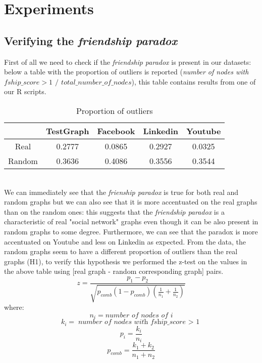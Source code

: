 \documentclass{article}
\begin{document}

\section{Experiments}
\subsection{Verifying the \textit{friendship paradox}}
First of all we need to check if the \textit{friendship paradox} is present in our datasets: below a table with the proportion of outliers is reported (\textit{number of nodes with $fship\_score > 1$ $/$ $total\_number\_of\_nodes$}), this table contains results from one of our R scripts. 
\begin{table}[ht]
\centering
\begin{tabular}{|c|c|c|c|c|}
\hline
& TestGraph & Facebook & Linkedin & Youtube \\ \hline
Real & 0.2777 & 0.0865 & 0.2927 & 0.0325\\ \hline
Random & 0.3636 & 0.4086 & 0.3556 & 0.3544 \\ \hline
\end{tabular}
\caption{Proportion of outliers}
\end{table} 
\\

We can immediately see that the \textit{frienship paradox} is true for both real and random graphs but we can also see that it is more accentuated on the real graphs than on the random ones: this suggests that the \textit{friendship paradox} is a characteristic of real "social network" graphs even though it can be also present in random graphs to some degree. Furthermore, we can see that the paradox is more accentuated on Youtube and less on Linkedin as expected. From the data, the random graphs seem to have a different proportion of outliers than the real graphs (H1), to verify this hypothesis we performed the z-test on the values in the above table using [real graph - random corresponding graph] pairs.
\[z = \frac{p_1 - p_2}{\sqrt{p_{comb} (1 - p_{comb}) \left( \frac{1}{n_1} + \frac{1}{n_2} \right)}}\]
where:
\[n_i = \textit{number of nodes of i}\]
\[k_i = \textit{number of nodes with fship\_score $>$ 1}\]
\[p_i = \frac{k_i}{n_i}\]
\[p_{comb} = \frac{k_1 + k_2}{n_1 + n_2}\]
\end{document}
